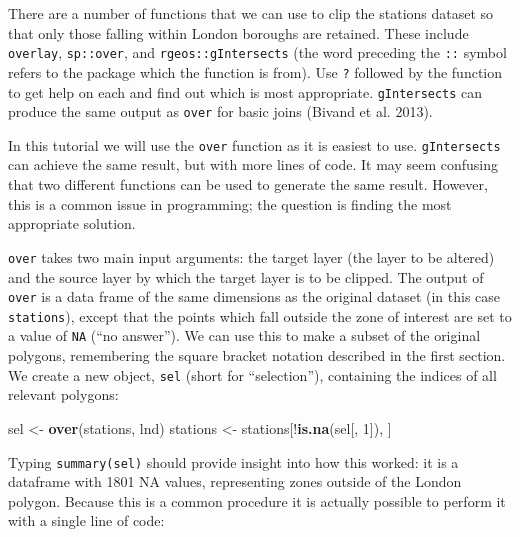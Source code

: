 \documentclass[]{article}
\newenvironment{Shaded}{}{}
\newcommand{\KeywordTok}[1]{\textcolor[rgb]{0.00,0.44,0.13}{\textbf{{#1}}}}
\newcommand{\DecValTok}[1]{\textcolor[rgb]{0.25,0.63,0.44}{{#1}}}
\newcommand{\NormalTok}[1]{{#1}}
\begin{document}
There are a number of functions that we can use to clip the stations
dataset so that only those falling within London boroughs are retained.
These include \texttt{overlay}, \texttt{sp::over}, and
\texttt{rgeos::gIntersects} (the word preceding the \texttt{::} symbol
refers to the package which the function is from). Use \texttt{?}
followed by the function to get help on each and find out which is most
appropriate. \texttt{gIntersects} can produce the same output as
\texttt{over} for basic joins (Bivand et al. 2013).

In this tutorial we will use the \texttt{over} function as it is easiest
to use. \texttt{gIntersects} can achieve the same result, but with more
lines of code. It may seem confusing that two different functions can be
used to generate the same result. However, this is a common issue in
programming; the question is finding the most appropriate solution.

\texttt{over} takes two main input arguments: the target layer (the
layer to be altered) and the source layer by which the target layer is
to be clipped. The output of \texttt{over} is a data frame of the same
dimensions as the original dataset (in this case \texttt{stations}),
except that the points which fall outside the zone of interest are set
to a value of \texttt{NA} (``no answer''). We can use this to make a
subset of the original polygons, remembering the square bracket notation
described in the first section. We create a new object, \texttt{sel}
(short for ``selection''), containing the indices of all relevant
polygons:

\begin{Shaded}
\begin{Highlighting}[]
\NormalTok{sel <- }\KeywordTok{over}\NormalTok{(stations, lnd)}
\NormalTok{stations <- stations[!}\KeywordTok{is.na}\NormalTok{(sel[, }\DecValTok{1}\NormalTok{]), ]}
\end{Highlighting}
\end{Shaded}
Typing \texttt{summary(sel)} should provide insight into how this
worked: it is a dataframe with 1801 NA values, representing zones
outside of the London polygon. Because this is a common procedure it is
actually possible to perform it with a single line of code:
\end{document}
